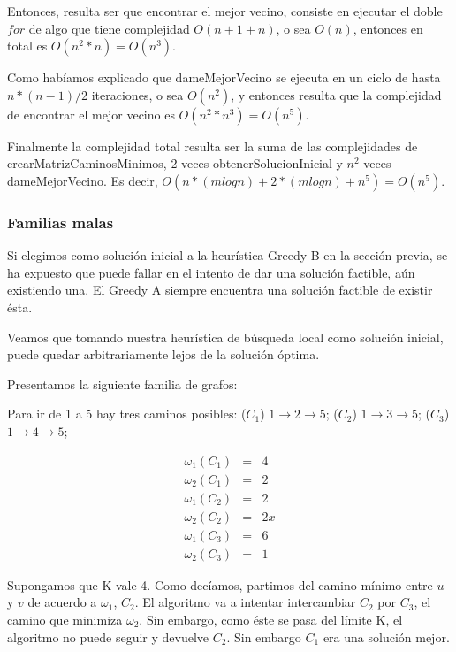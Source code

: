 Entonces, resulta ser que encontrar el mejor vecino, consiste en ejecutar el doble $for$ de algo que tiene complejidad $O(n + 1 + n)$, o sea $O(n)$, entonces en total es $O(n^2 * n) = O(n^3)$.

Como habíamos explicado que dameMejorVecino se ejecuta en un ciclo de hasta $n * (n-1) / 2$ iteraciones, o sea $O(n^2)$, y entonces resulta que la complejidad de encontrar el mejor vecino es $O(n^2 * n^3) = O(n^5)$. 

Finalmente la complejidad total resulta ser la suma de las complejidades de crearMatrizCaminosMinimos, 2 veces obtenerSolucionInicial y $n^2$ veces dameMejorVecino. Es decir, $O(n * (m log n) + 2 * (m log n) + n^5) = O(n^5)$.

\subsubsection{Familias malas}

Si elegimos como solución inicial a la heurística Greedy B en la sección previa, se ha expuesto que puede fallar en el intento de dar una solución factible, aún existiendo una. El Greedy A siempre encuentra una solución factible de existir ésta. 

Veamos que tomando nuestra heurística de búsqueda local como solución inicial, puede quedar arbitrariamente lejos de la solución óptima.

Presentamos la siguiente familia de grafos:


Para ir de 1 a 5 hay tres caminos posibles: ($C_1$) $1 \rightarrow 2 \rightarrow 5$; ($C_2$) $1 \rightarrow 3 \rightarrow 5$;
($C_3$) $1 \rightarrow 4 \rightarrow 5$;

\begin{eqnarray}
 \omega_1(C_1) &=& 4	\\ 
 \omega_2(C_1) &=& 2	\\
 \omega_1(C_2) &=& 2	\\
 \omega_2(C_2) &=& 2x   \\
 \omega_1(C_3) &=& 6	\\
 \omega_2(C_3) &=& 1
\end{eqnarray}

Supongamos que K vale 4.
Como decíamos, partimos del camino mínimo entre $u$ y $v$ de acuerdo a $\omega_1$, $C_2$. El algoritmo va a intentar intercambiar $C_2$ por
$C_3$, el camino que minimiza $\omega_2$. Sin embargo, como éste se pasa del límite K, el algoritmo no puede seguir y devuelve $C_2$. Sin
embargo $C_1$ era una solución mejor.

